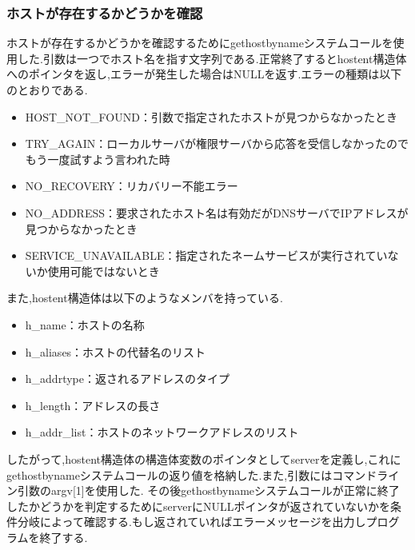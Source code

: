 \documentclass[dvipdfmx]{jarticle}
\begin{document}
\subsubsection{ホストが存在するかどうかを確認}
ホストが存在するかどうかを確認するためにgethostbynameシステムコールを使用した.\cite{4}引数は一つでホスト名を指す文字列である.正常終了するとhostent構造体へのポインタを返し,エラーが発生した場合はNULLを返す.エラーの種類は以下のとおりである.
\begin{itemize}
    \item HOST\_NOT\_FOUND：引数で指定されたホストが見つからなかったとき
    \item TRY\_AGAIN：ローカルサーバが権限サーバから応答を受信しなかったのでもう一度試すよう言われた時
    \item NO\_RECOVERY：リカバリー不能エラー
    \item NO\_ADDRESS：要求されたホスト名は有効だがDNSサーバでIPアドレスが見つからなかったとき
    \item SERVICE\_UNAVAILABLE：指定されたネームサービスが実行されていないか使用可能ではないとき
\end{itemize}
また,hostent構造体は以下のようなメンバを持っている.\cite{5}
\begin{itemize}
    \item h\_name：ホストの名称
    \item h\_aliases：ホストの代替名のリスト
    \item h\_addrtype：返されるアドレスのタイプ
    \item h\_length：アドレスの長さ
    \item h\_addr\_list：ホストのネットワークアドレスのリスト
\end{itemize}
したがって,hostent構造体の構造体変数のポインタとしてserverを定義し,これにgethostbynameシステムコールの返り値を格納した.また,引数にはコマンドライン引数のargv[1]を使用した.
その後gethostbynameシステムコールが正常に終了したかどうかを判定するためにserverにNULLポインタが返されていないかを条件分岐によって確認する.もし返されていればエラーメッセージを出力しプログラムを終了する.
\end{document}

